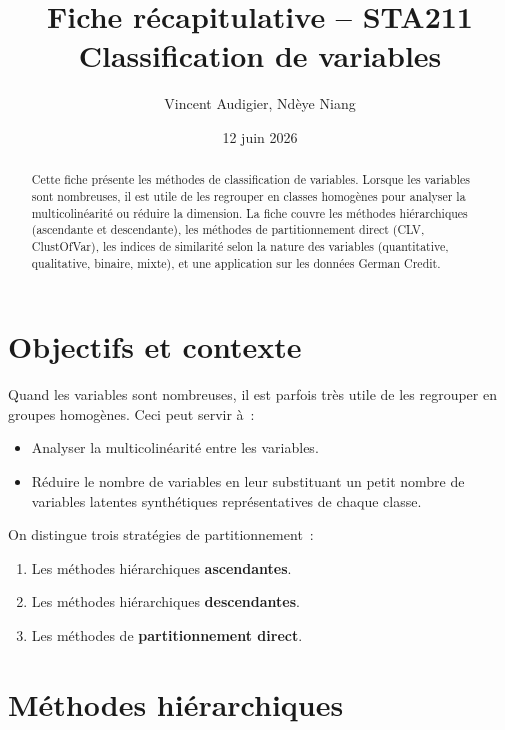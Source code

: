 \documentclass[a4paper,11pt]{article}
\title{\textbf{Fiche r\'ecapitulative -- STA211}\\[4pt]
\large Classification de variables}
\author{Vincent Audigier, Nd\`eye Niang}
\date{12 juin 2026}
\theoremstyle{definition}
\theoremstyle{remark}
\begin{document}
\maketitle
\thispagestyle{empty}

\begin{abstract}
Cette fiche pr\'esente les m\'ethodes de classification de variables.
Lorsque les variables sont nombreuses, il est utile de les regrouper en
classes homog\`enes pour analyser la multicolin\'earit\'e ou r\'eduire
la dimension. La fiche couvre les m\'ethodes hi\'erarchiques
(ascendante et descendante), les m\'ethodes de partitionnement direct
(CLV, ClustOfVar), les indices de similarit\'e selon la nature des
variables (quantitative, qualitative, binaire, mixte), et une
application sur les donn\'ees German Credit.
\end{abstract}

\vfill
\tableofcontents
\newpage

\section{Objectifs et contexte}

Quand les variables sont nombreuses, il est parfois tr\`es utile de
les regrouper en groupes homog\`enes. Ceci peut servir \`a~:
\begin{itemize}
  \item Analyser la multicolin\'earit\'e entre les variables.
  \item R\'eduire le nombre de variables en leur substituant un petit
    nombre de variables latentes synth\'etiques repr\'esentatives de
    chaque classe.
\end{itemize}

On distingue trois strat\'egies de partitionnement~:
\begin{enumerate}
  \item Les m\'ethodes hi\'erarchiques \textbf{ascendantes}.
  \item Les m\'ethodes hi\'erarchiques \textbf{descendantes}.
  \item Les m\'ethodes de \textbf{partitionnement direct}.
\end{enumerate}

\section{M\'ethodes hi\'erarchiques}
\end{document}
